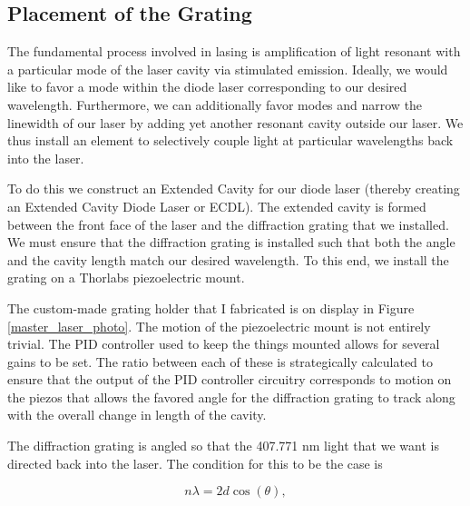 
\subsection{Placement of the Grating}



The fundamental process involved in lasing is amplification of light resonant with a particular mode of the laser cavity via stimulated emission. Ideally, we would like to favor a mode within the diode laser corresponding to our desired wavelength. Furthermore, we can additionally favor modes and narrow the linewidth of our laser by adding yet another resonant cavity outside our laser. We thus install an element to selectively couple light at particular wavelengths back into the laser. 

To do this we construct an Extended Cavity for our diode laser (thereby creating an Extended Cavity Diode Laser or ECDL). The extended cavity is formed between the front face of the laser and the diffraction grating that we installed. We must ensure that the diffraction grating is installed such that both the angle and the cavity length match our desired wavelength. To this end, we install the grating on a Thorlabs piezoelectric mount.

The custom-made grating holder that I fabricated is on display in Figure\,\ref{master_laser_photo}. The motion of the piezoelectric mount is not entirely trivial. The PID controller used to keep the things mounted %
allows for several gains to be set. The ratio between each of these is strategically calculated to ensure that the output of the PID controller circuitry corresponds to motion on the piezos that allows the favored angle for the diffraction grating to track along with the overall change in length of the cavity. 
 
The diffraction grating is angled so that the 407.771 nm light that we want is directed back into the laser. The condition for this to be the case is 

\begin{equation}
n \lambda = 2 d \cos(\theta),
\end{equation}

